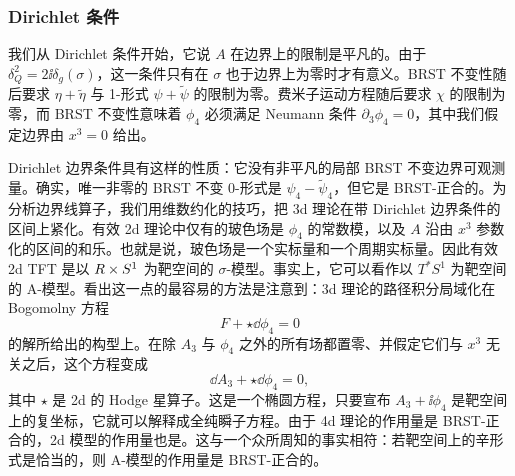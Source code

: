 

\subsubsection{Dirichlet 条件}

我们从 Dirichlet 条件开始，它说 $A$ 在边界上的限制是平凡的。由于 $\delta_Q^2=2\ii\delta_g(\sigma)$，这一条件只有在 $\sigma$ 也于边界上为零时才有意义。BRST 不变性随后要求 $\eta+\tilde\eta$ 与 1-形式 $\psi+\tilde\psi$ 的限制为零。费米子运动方程随后要求 $\chi$ 的限制为零，而 BRST 不变性意味着 $\phi_4$ 必须满足 Neumann 条件 $\partial_3\phi_4=0$，其中我们假定边界由 $x^3=0$ 给出。


Dirichlet 边界条件具有这样的性质：它没有非平凡的局部 BRST 不变边界可观测量。确实，唯一非零的 BRST 不变 0-形式是 $\psi_4-\tilde\psi_4$，但它是 BRST-正合的。为分析边界线算子，我们用维数约化的技巧，把 3d 理论在带 Dirichlet 边界条件的区间上紧化。有效 2d 理论中仅有的玻色场是 $\phi_4$ 的常数模，以及 $A$ 沿由 $x^3$ 参数化的区间的和乐。也就是说，玻色场是一个实标量和一个周期实标量。因此有效 2d TFT 是以 $R\times S^1$ 为靶空间的 $\sigma$-模型。事实上，它可以看作以 $T^*S^1$ 为靶空间的 A-模型。看出这一点的最容易的方法是注意到：3d 理论的路径积分局域化在 Bogomolny 方程
\[
F+\star\dd\phi_4=0
\]
的解所给出的构型上。在除 $A_3$ 与 $\phi_4$ 之外的所有场都置零、并假定它们与 $x^3$ 无关之后，这个方程变成
\[
\dd A_3+\star\dd\phi_4=0,
\]
其中 $\star$ 是 2d 的 Hodge 星算子。这是一个椭圆方程，只要宣布 $A_3+\ii\phi_4$ 是靶空间上的复坐标，它就可以解释成全纯瞬子方程。由于 4d 理论的作用量是 BRST-正合的，2d 模型的作用量也是。这与一个众所周知的事实相符：若靶空间上的辛形式是恰当的，则 A-模型的作用量是 BRST-正合的。

